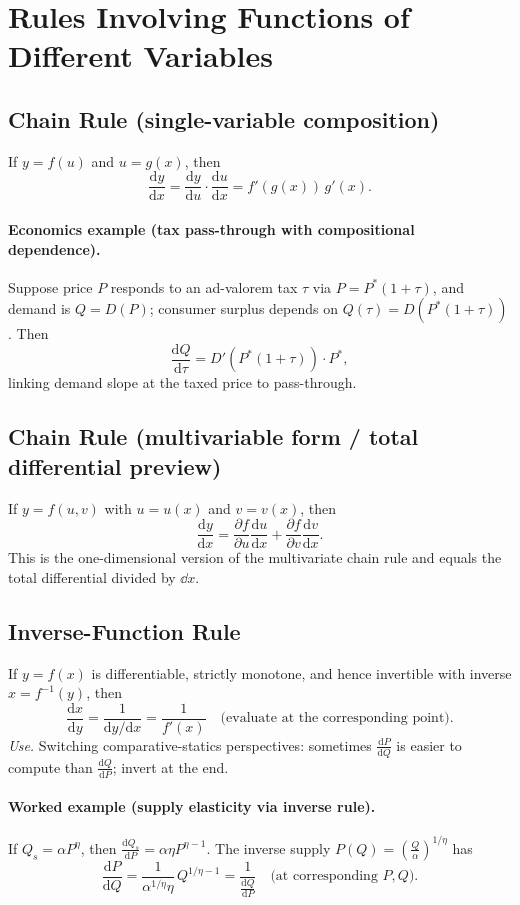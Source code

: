 \documentclass[11pt]{article}
\newcommand{\pd}[2]{\frac{\partial #1}{\partial #2}}
\newcommand{\dtotal}[2]{\frac{\mathrm{d} #1}{\mathrm{d} #2}}
\begin{document}
\section{Rules Involving Functions of Different Variables}

\subsection*{Chain Rule (single-variable composition)}
If $y=f(u)$ and $u=g(x)$, then
\[
\dtotal{y}{x}=\frac{\mathrm{d}y}{\mathrm{d}u}\cdot \frac{\mathrm{d}u}{\mathrm{d}x}=f'(g(x))\,g'(x).
\]

\paragraph{Economics example (tax pass-through with compositional dependence).}
Suppose price $P$ responds to an ad-valorem tax $\tau$ via $P=P^*(1+\tau)$, and demand is $Q=D(P)$; consumer surplus depends on $Q(\tau)=D(P^*(1+\tau))$. Then
\[
\dtotal{Q}{\tau}=D'(P^*(1+\tau))\cdot P^*,
\]
linking demand slope at the taxed price to pass-through.

\subsection*{Chain Rule (multivariable form / total differential preview)}
If $y=f(u,v)$ with $u=u(x)$ and $v=v(x)$, then
\[
\dtotal{y}{x}=\pd{f}{u}\dtotal{u}{x}+\pd{f}{v}\dtotal{v}{x}.
\]
This is the one-dimensional version of the multivariate chain rule and equals the total differential divided by $\dd x$.

\subsection*{Inverse-Function Rule}
If $y=f(x)$ is differentiable, strictly monotone, and hence invertible with inverse $x=f^{-1}(y)$, then
\[
\frac{\mathrm{d}x}{\mathrm{d}y}=\frac{1}{\mathrm{d}y/\mathrm{d}x}=\frac{1}{f'(x)}\quad\text{(evaluate at the corresponding point)}.
\]
\textit{Use.} Switching comparative-statics perspectives: sometimes $\dtotal{P}{Q}$ is easier to compute than $\dtotal{Q}{P}$; invert at the end.

\paragraph{Worked example (supply elasticity via inverse rule).}
If $Q_s=\alpha P^\eta$, then $\dtotal{Q_s}{P}=\alpha\eta P^{\eta-1}$. The inverse supply $P(Q)=\left(\frac{Q}{\alpha}\right)^{1/\eta}$ has
\[
\dtotal{P}{Q}=\frac{1}{\alpha^{1/\eta}\eta}\,Q^{1/\eta-1}=\frac{1}{\dtotal{Q}{P}}\quad\text{(at corresponding $P,Q$)}.
\]
\end{document}
